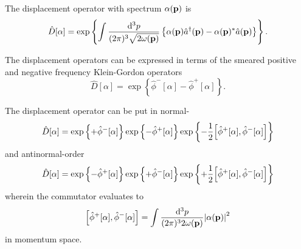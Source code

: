 \begin{definition}
	The displacement operator with spectrum $\alpha(\vb{p})$ is
	\begin{equation}
		\hat{D}[\alpha]
		=
		\exp\left\{
			\int\frac{\dd[3]{p}}{(2\pi)^3\sqrt{2\omega(\vb{p})}}
			\left\{
				\alpha(\vb{p})
				\hat{a}^\dagger(\vb{p})
				-
				\alpha(\vb{p})^*
				\hat{a}(\vb{p})
			\right\}
		\right\}
		\label{eq:qkg_displacement_operator}
		.
	\end{equation}
\end{definition}
\begin{corollary}\label{thm:qkg_displacement_smeared}
	The displacement operators can be expressed in terms of the smeared positive and negative frequency Klein-Gordon operators
	\begin{equation}
		\hat{D}[\alpha]
		=
		\exp\left\{
			\hat\phi^-[\alpha]
			-
			\hat\phi^+[\alpha]
		\right\}
		.
	\end{equation}
\end{corollary}
\begin{lemma}\label{thm:qkg_displacement_ordered}
	The displacement operator can be put in normal-
	\begin{equation}\label{eq:qkg_displacement_normal}
		\hat{D}[\alpha]
		=
		\exp\left\{
			+\hat\phi^-[\alpha]
		\right\}
		\exp\left\{
			-\hat\phi^+[\alpha]
		\right\}
		\exp\left\{
			-
			\frac{1}{2}
			\comm{\hat\phi^+[\alpha]}{\hat\phi^-[\alpha]}
		\right\}
	\end{equation}
	and antinormal-order
	\begin{equation}\label{eq:qkg_displacement_antinormal}
		\hat{D}[\alpha]
		=
		\exp\left\{
			-\hat\phi^+[\alpha]
		\right\}
		\exp\left\{
			+\hat\phi^-[\alpha]
		\right\}
		\exp\left\{
			+
			\frac{1}{2}
			\comm{\hat\phi^+[\alpha]}{\hat\phi^-[\alpha]}
		\right\}
	\end{equation}
	wherein the commutator evaluates to
	\begin{equation}
		\comm{\hat\phi^+[\alpha]}{\hat\phi^-[\alpha]}
		=
		\int\frac{\dd[3]{p}}{(2\pi)^32\omega(\vb{p})}
		\abs{\alpha(\vb{p})}^2
	\end{equation}
	in momentum space.
\end{lemma}
